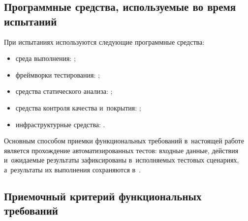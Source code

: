 \documentclass[12pt,a4paper]{extarticle}
\begin{document}
\subsection{Программные средства, используемые во время испытаний}

\begin{hseExample}
При испытаниях используются следующие программные средства:

\begin{itemize}[leftmargin=1.25cm]
    \item среда выполнения: ;
    \item фреймворки тестирования: ;
    \item средства статического анализа: ;
    \item средства контроля качества и~покрытия: ;
    \item инфраструктурные средства: .
\end{itemize}

Основным способом приемки функциональных требований в~настоящей работе является прохождение автоматизированных тестов: входные данные, действия и~ожидаемые результаты зафиксированы в~исполняемых тестовых сценариях, а~результаты их выполнения сохраняются в~.
\end{hseExample}

\subsection{Приемочный критерий функциональных требований}
\end{document}
